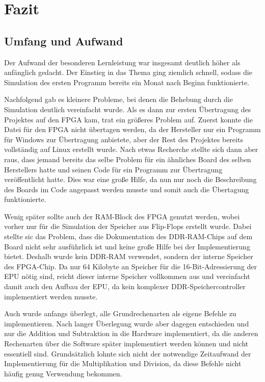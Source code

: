 \chapter{Fazit}
\label{c:fazit}
\section{Umfang und Aufwand}
Der Aufwand der besonderen Lernleistung war insgesamt deutlich höher als
anfänglich gedacht. Der Einstieg in das Thema ging ziemlich schnell, sodass die
Simulation des ersten Programm bereits ein Monat nach Beginn funktionierte.

Nachfolgend gab es kleinere Probleme, bei denen die Behebung durch die
Simulation deutlich vereinfacht wurde. Als es dann zur ersten Übertragung des
Projektes auf den \ac{FPGA} kam, trat ein größeres Problem auf. Zuerst konnte die
Datei für den \ac{FPGA} nicht übertagen werden, da der Hersteller nur ein Programm
für Windows zur Übertragung anbietete, aber der Rest des Projektes bereits
vollständig auf Linux erstellt wurde. Nach etwas Recherche stellte sich dann
aber raus, dass jemand bereits das selbe Problem für ein ähnliches Board des
selben Herstellers hatte und seinen Code für ein Programm zur Übertragung
veröffentlicht hatte. Dies war eine große Hilfe, da nun nur noch die
Beschreibung des Boards im Code angepasst werden musste und somit auch die
Übertagung funktionierte.

Wenig später sollte auch der RAM-Block des \ac{FPGA} genutzt werden, wobei
vorher nur für die Simulation der Speicher aus Flip-Flops erstellt wurde. Dabei
stellte sic das Problem, dass die Dokumentation des DDR-RAM-Chips auf dem Board
nicht sehr ausführlich ist und keine große Hilfe bei der Implementierung bietet.
Deshalb wurde kein DDR-RAM verwendet, sondern der interne Speicher des
\ac{FPGA}-Chip. Da nur 64 Kilobyte an Speicher für die 16-Bit-Adressierung der
\ac{EPU} nötig sind, reicht dieser interne Speicher vollkommen aus und
vereinfacht damit auch den Aufbau der \ac{EPU}, da kein komplexer
DDR-Speichercontroller implementiert werden musste.

Auch wurde anfangs überlegt, alle Grundrechenarten als eigene Befehle zu
implementieren. Nach langer Überlegung wurde aber dagegen entschieden und nur
die Addition und Subtraktion in die Hardware implementiert, da die anderen
Rechenarten über die Software später implementiert werden können und nicht
essentiell sind. Grundsätzlich lohnte sich nicht der notwendige Zeitaufwand der
Implementierung für die Multiplikation und Division, da diese Befehle nicht
häufig genug Verwendung bekommen.

